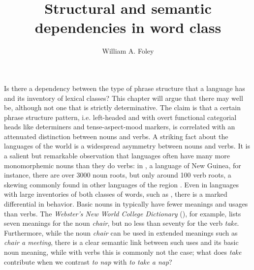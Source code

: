 \documentclass[output=paper]{langsci/langscibook}
\author{William A. Foley\affiliation{The University of Sydney}}
\title{Structural and semantic dependencies in word class}
\begin{document}
 
   
\noindent Is there a dependency between the type of phrase structure that a language has and its inventory of lexical classes? This chapter will argue that there may well be, although not one that is strictly determinative. The claim is that a certain phrase structure pattern, i.e. left-headed and with overt functional categorial heads like determiners and tense-aspect-mood markers, is correlated with an attenuated distinction between nouns and verbs. A striking fact about the languages of the world is a widespread asymmetry between nouns and verbs. It is a salient but remarkable observation that languages often have many more monomorphemic nouns than they do verbs: in , a language of New Guinea, for instance, there are over 3000 noun roots, but only around 100 verb roots, a skewing commonly found in other languages of the region \citep{Pawley1994}. Even in languages with large inventories of both classes of words, such as , there is a marked differential in behavior. Basic nouns in  typically have fewer meanings and usages than verbs. The \textit{Webster’s New World College Dictionary} (\citeyear{Webster2009}), for example, lists seven meanings for the noun \textit{chair}, but no less than seventy for the verb \textit{take}. Furthermore, while the noun \textit{chair} can be used in extended meanings such as \textit{chair a meeting}, there is a clear semantic link between such uses and its basic noun meaning, while with verbs this is commonly not the case; what does \textit{take} contribute when we contrast \textit{to nap} with \textit{to take a nap}? 
\end{document}
